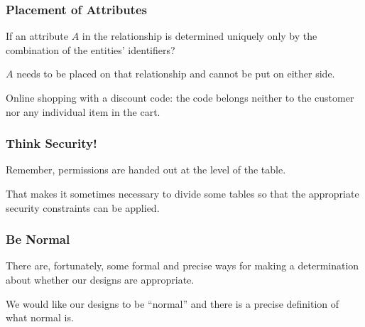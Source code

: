 \begin{frame}
\frametitle{Placement of Attributes}

If an attribute $A$ in the relationship is determined uniquely only by the combination of the entities' identifiers? 

$A$ needs to be placed on that relationship and cannot be put on either side. 

Online shopping with a discount code: the code belongs neither to the customer nor any individual item in the cart.



\end{frame}


\begin{frame}
\frametitle{Think Security!}

Remember, permissions are handed out at the level of the table.

That makes it sometimes necessary to divide some tables so that the appropriate security constraints can be applied. 


\end{frame}


\begin{frame}
\frametitle{Be Normal}

 There are, fortunately, some formal and precise ways for making a determination about whether our designs are appropriate. 
 
 We would like our designs to be ``normal'' and there is a precise definition of what normal is. 


\end{frame}






